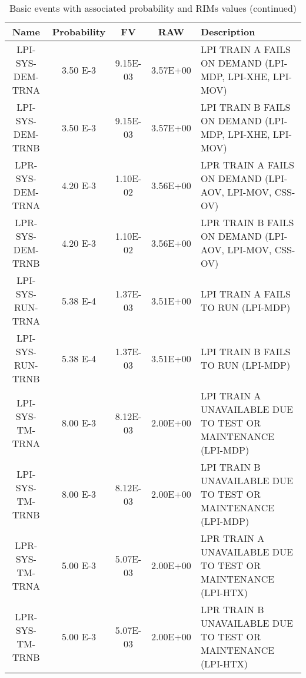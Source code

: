 \begin{table}
  \centering
  \begin{tabular}{c | c | c | c | p{5cm}} 
    \hline 
     Name           & Probability  & FV        &  RAW     & Description \\ 
    \hline 
     LPI-SYS-DEM-TRNA & 3.50 E-3     &  9.15E-03 & 3.57E+00  & LPI TRAIN A FAILS ON DEMAND (LPI-MDP, LPI-XHE, LPI-MOV) \\
     LPI-SYS-DEM-TRNB & 3.50 E-3     &  9.15E-03 & 3.57E+00  & LPI TRAIN B FAILS ON DEMAND (LPI-MDP, LPI-XHE, LPI-MOV) \\
     LPR-SYS-DEM-TRNA & 4.20 E-3     &  1.10E-02 & 3.56E+00  & LPR TRAIN A FAILS ON DEMAND (LPI-AOV, LPI-MOV, CSS-OV) \\
     LPR-SYS-DEM-TRNB & 4.20 E-3     &  1.10E-02 & 3.56E+00  & LPR TRAIN B FAILS ON DEMAND (LPI-AOV, LPI-MOV, CSS-OV) \\
     LPI-SYS-RUN-TRNA & 5.38 E-4     &  1.37E-03 & 3.51E+00  & LPI TRAIN A FAILS TO RUN (LPI-MDP) \\
     LPI-SYS-RUN-TRNB & 5.38 E-4     &  1.37E-03 & 3.51E+00  & LPI TRAIN B FAILS TO RUN (LPI-MDP) \\
     LPI-SYS-TM-TRNA  & 8.00 E-3     &  8.12E-03 & 2.00E+00  & LPI TRAIN A UNAVAILABLE DUE TO TEST OR MAINTENANCE (LPI-MDP) \\
     LPI-SYS-TM-TRNB  & 8.00 E-3     &  8.12E-03 & 2.00E+00  & LPI TRAIN B UNAVAILABLE DUE TO TEST OR MAINTENANCE (LPI-MDP) \\
     LPR-SYS-TM-TRNA  & 5.00 E-3     &  5.07E-03 & 2.00E+00  & LPR TRAIN A UNAVAILABLE DUE TO TEST OR MAINTENANCE (LPI-HTX) \\
     LPR-SYS-TM-TRNB  & 5.00 E-3     &  5.07E-03 & 2.00E+00  & LPR TRAIN B UNAVAILABLE DUE TO TEST OR MAINTENANCE (LPI-HTX) \\
    \hline 
  \end{tabular}
  \caption{Basic events with associated probability and RIMs values (continued)}
\end{table}


